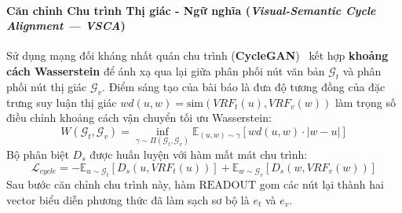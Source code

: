 \documentclass[conference,10pt]{IEEEtran}
\begin{document}
\paragraph{Căn chỉnh Chu trình Thị giác - Ngữ nghĩa (\textit{Visual-Semantic Cycle Alignment --- VSCA})}
Sử dụng mạng đối kháng nhất quán chu trình (\textbf{CycleGAN})~\cite{zhu2017cyclegan} kết hợp \textbf{khoảng cách Wasserstein} để ánh xạ qua lại giữa phân phối nút văn bản $\mathcal{G}_t$ và phân phối nút thị giác $\mathcal{G}_v$. Điểm sáng tạo của bài báo là đưa độ tương đồng của đặc trưng suy luận thị giác $wd(u, w) = \text{sim}\left(VRF_t(u), VRF_v(w)\right)$ làm trọng số điều chỉnh khoảng cách vận chuyển tối ưu Wasserstein:
\begin{equation}
    W(\mathcal{G}_t, \mathcal{G}_v) = \inf_{\gamma \sim \Pi(\mathcal{G}_t, \mathcal{G}_v)} \mathbb{E}_{(u, w) \sim \gamma} \left[ wd(u, w) \cdot |w - u| \right]
    \label{eq:cmavrp_wasserstein}
\end{equation}
Bộ phân biệt $D_s$ được huấn luyện với hàm mất mát chu trình:
\begin{equation}
    \mathcal{L}_{cycle} = -\mathbb{E}_{u \sim \mathcal{G}_t} \left[ D_s\left(u, VRF_t(u)\right) \right] + \mathbb{E}_{w \sim \mathcal{G}_v} \left[ D_s\left(w, VRF_v(w)\right) \right]
    \label{eq:cmavrp_lcycle}
\end{equation}
Sau bước căn chỉnh chu trình này, hàm $\text{READOUT}$ gom các nút lại thành hai vector biểu diễn phương thức đã làm sạch sơ bộ là $e_t$ và $e_v$.
\end{document}
